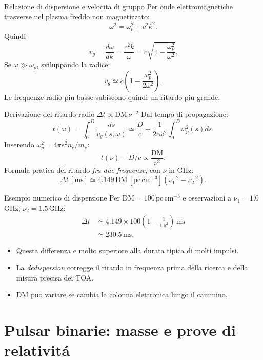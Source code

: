 \begin{frame}[t]{Relazione di dispersione e velocita di gruppo}
\small
Per onde elettromagnetiche trasverse nel plasma freddo non magnetizzato:
\[
\omega^2=\omega_p^2+c^2k^2.
\]
Quindi
\[
v_g=\frac{d\omega}{dk}=\frac{c^2k}{\omega}
=c\sqrt{1-\frac{\omega_p^2}{\omega^2}}.
\]
Se $\omega\gg\omega_p$, sviluppando la radice:
\[
v_g\simeq c\left(1-\frac{\omega_p^2}{2\omega^2}\right).
\]
Le frequenze radio piu basse subiscono quindi un ritardo piu grande.
\end{frame}

\begin{frame}[t]{Derivazione del ritardo radio $\Delta t\propto\mathrm{DM}\,\nu^{-2}$}
\small
Dal tempo di propagazione:
\[
t(\omega)=\int_0^D\frac{ds}{v_g(s,\omega)}
\simeq\frac Dc+\frac1{2c\omega^2}\int_0^D\omega_p^2(s)ds.
\]
Inserendo $\omega_p^2=4\pi e^2n_e/m_e$:
\[
t(\nu)-D/c\propto\frac{\mathrm{DM}}{\nu^2}.
\]
Formula pratica del ritardo \emph{fra due frequenze}, con $\nu$ in GHz:
\[
\Delta t\,[\mathrm{ms}]
\simeq4.149\,\mathrm{DM}\,[\mathrm{pc\,cm^{-3}}]
\left(\nu_1^{-2}-\nu_2^{-2}\right).
\]
\end{frame}

\begin{frame}[t]{Esempio numerico di dispersione}
\small
Per $\mathrm{DM}=100\,\mathrm{pc\,cm^{-3}}$ e osservazioni a $\nu_1=1.0\,$GHz, $\nu_2=1.5\,$GHz:
\[
\begin{aligned}
\Delta t&\simeq4.149\times100\left(1-\frac1{1.5^2}\right)\,\mathrm{ms}\\
&\simeq230.5\,\mathrm{ms}.
\end{aligned}
\]
\begin{itemize}
\item Questa differenza e molto superiore alla durata tipica di molti impulsi.
\item La \emph{dedispersion} corregge il ritardo in frequenza prima della ricerca e della misura precisa dei TOA.
\item DM puo variare se cambia la colonna elettronica lungo il cammino.
\end{itemize}
\end{frame}

\section{Pulsar binarie: masse e prove di relativit\'a}

